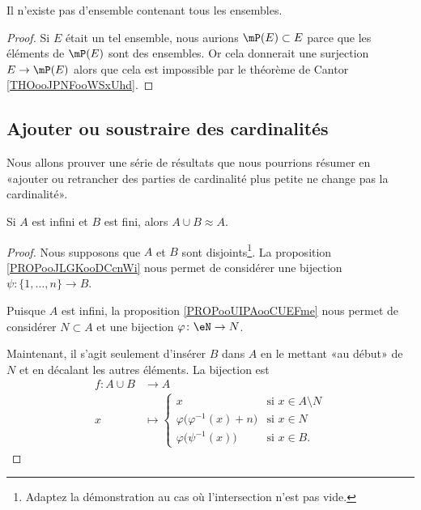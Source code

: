 \begin{corollary}       \label{CORooZMAOooPfJosM}
    Il n'existe pas d'ensemble contenant tous les ensembles.
\end{corollary}

\begin{proof}
    Si \( E\) était un tel ensemble, nous aurions \( \mP(E)\subset E\) parce que les éléments de \( \mP(E)\) sont des ensembles. Or cela donnerait une surjection \( E\to \mP(E)\) alors que cela est impossible par le théorème de Cantor \ref{THOooJPNFooWSxUhd}.
\end{proof}

\subsection{Ajouter ou soustraire des cardinalités}

Nous allons prouver une série de résultats que nous pourrions résumer en  «ajouter ou retrancher des parties de cardinalité plus petite ne change pas la cardinalité».

\begin{lemma}        \label{LEMooUFCAooSyZtZj}
    Si \( A\) est infini et \( B\) est fini, alors \( A\cup B\approx A\).
\end{lemma}

\begin{proof}
    Nous supposons que \( A\) et \( B\) sont disjoints\footnote{Adaptez la démonstration au cas où l'intersection n'est pas vide.}. La proposition \ref{PROPooJLGKooDCcnWi} nous permet de considérer une bijection \( \psi\colon \{ 1,\ldots, n \}\to B\).
    
    Puisque \( A\) est infini, la proposition \ref{PROPooUIPAooCUEFme} nous permet de considérer \( N\subset A\) et une bijection \( \varphi\colon \eN\to N\).

    Maintenant, il s'agit seulement d'insérer \( B\) dans \( A\) en le mettant «au début» de \( N\) et en décalant les autres éléments. La bijection est
    \begin{equation}
        \begin{aligned}
            f\colon A\cup B&\to A \\
            x&\mapsto \begin{cases}
                x    &   \text{si } x\in A\setminus N\\
                \varphi\big( \varphi^{-1}(x)+n \big)    &   \text{si } x\in N\\
                \varphi\big( \psi^{-1}(x) \big)    &    \text{si }x\in B.
            \end{cases}
        \end{aligned}
    \end{equation}
\end{proof}

